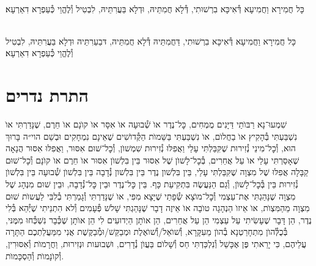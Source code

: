 \documentclass[twoside, openany, parskip=half, 11pt]{book}
\begin{document}
\\
כָּל חֲמִירָא וַחֲמִיעָא דְּ֯אִיכָּא בִרְשׁוּתִי, דְּ֯לָא חֲמִתֵּיהּ, וּדְלָא בַּעֲרִתֵּיהּ, לִבְטִיל וְ֯לֶהֱוֵי כְּ֯עַפְרָא דִאַרְעָא׃


\\
כָּל חֲמִירָא וַחֲמִיעָא דְּ֯אִיכָּא בִרְשׁוּתִי, דַּחֲמִתֵּיהּ דְּ֯לָא חֲמִתֵּיהּ, דּבַעַרִתֵּיהּ וּדְלָא בַּעֲרִתֵּיהּ, לִבְטִיל וְ֯לֶהֱוֵי כְּ֯עַפְרָא דִאַרְעָא׃



\chapter[התרת נדרים]{ התרת נדרים }


שִׁמְעוּ־נָא רַבּוׂתַי דַּיָּנִים מֻמְחִים, כׇּל־נֶדֶר אוׂ שְׁ֯בוּעָה אוׂ אִסָּר אוׂ קוׂנָם אוׂ חֵרֶם, שֶׁנָּדַרְתִּי אוׂ נִשְׁבַּעְתִּי בְּ֯הָקִיץ אוׂ בַחֲלוׂם, אוׂ נִשְׁבַּעְתִּי בַּשֵּׁמוׂת הַקְּ֯דוׂשִׁים שֶׁאֵינָם נִמְחָקִים וּבְשֵׁם הוי״ה בָּרוּךְ הוּא, וְ֯כׇל־מִינֵי נְ֯זִירוּת שֶׁקִּבַּלְתִּי עָלַי וַאֲפִלּוּ נְ֯זִירוּת שִׁמְשׁוׂן, וְ֯כׇל־שׁוּם אִסּוּר, וַאֲפִלּוּ אִסּוּר הֲנָאָה שֶׁאָסַרְתִּי עָלַי אוׂ עַל אֲחֵרִים, בְּ֯כׇל־לָשׁוׂן שֶׁל אִסּוּר בֵּין בִּלְשׁוׂן אִסּוּר אוׂ חֵרֶם אוׂ קוׂנָם וְ֯כׇל־שׁוּם קַבָּלָה אֲפִלּוּ שֶׁל מִצְוָה שֶׁקִּבַּלְתִּי עָלַי, בֵּין בִּלְשׁון נֶדֶר בֵּין בִּלְשׁון נְ֯דָבָה בֵּין בִּלְשׁוׂן שְׁ֯בוּעָה בֵּין בִּלְשׁוׂן נְ֯זִירוּת בֵּין בְּ֯כׇל־לָשׁוׂן, וְ֯גַם הַנַּעֲשֶׂה בִּתְקִיעַת כָּף. בֵּין כׇּל־נֶדֶר וּבֵין כׇּל־נְ֯דָבָה, וּבֵין שׁוּם מִנְהָג שֶׁל מִצְוָה שֶׁנָּהַגְתִּי אֶת־עַצְמִי וְ֯כׇל־מוׂצָא שְׂ֯פָתַי שֶׁיָּצָא מִפִּי, אוׂ שֶׁנָּדַרְתִּי וְ֯גָמַרְתִּי בְ֯לִבִּי לַעֲשוׂת שׁוּם מִצְוָה מֵהַמִּצְוׂת, אוׂ אֵיזוׂ הַנְהָגָה טוׂבָה אוׂ אֵיזֶה דָבָר שֶׁנָּהַגְתִּי שָׁלשׁ פְּ֯עָמִים וְ֯לא הִתְנֵיתִי שֶׁיְּ֯הֵא בְּ֯לִי נֶדֶר, הֵן דָּבָר שֶׁעָשִׂיתִי עַל עַצְמִי הֵן עַל אֲחֵרִים, הֵן אוׂתָן הַיְדוּעִים לִי הֵן אוׂתָן שֶׁכְּ֯בָר נִשְׁכְּ֯חוּ מִמֶּנּי, בְּ֯כֻלְּ֯הוׂן מִתְחָרַטְנָא בְ֯הוׂן מֵעִקָּרָא, וְ֯שׁוׂאֵל/וְ֯שׁוׂאֶלֶת וּמְבַקֵּשׁ/וּמְ֯בַקֶּשֶׁת אֲנִי מִמַּעֲלַתְכֶם הַתָּרָה עֲלֵיהֶם, כִּי יָרֵאתִי פֶּן אֶכָּשֵׁל וְ֯נִלְכַּדְתִּי חַס וְ֯שָׁלוׂם בַּעֲוׂן נְ֯דָרִים, וּשְׁבוּעות וּנְזִירוּת, וַחֲרָמוׂת וְ֯אִסּוּרִין, וְ֯קוׂנָמוׂת וְ֯הַסְכָּמוׂת.
\end{document}
